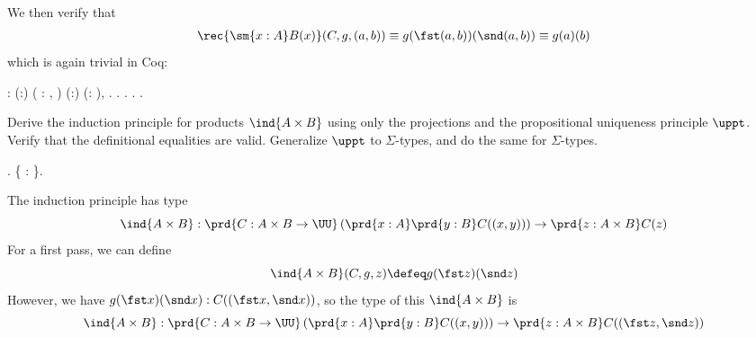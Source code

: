 \noindent
We then verify that
\begin{align*}
\rec{\sm{x:A}B(x)}(C, g, (a, b))
\equiv g(\fst (a, b))(\snd (a, b))
\equiv g(a)(b)
\end{align*}
which is again trivial in Coq: \begin{coqdoccode}
\coqdocemptyline
\coqdocindent{1.00em}
  : \coqdockw{\ensuremath{\forall}} (:) ( : \coqdockw{\ensuremath{\forall}} ,    ) (:) (: ), \coqdoceol
\coqdocindent{2.00em}
   \coqdocnotation{(}\coqdocnotation{;} \coqdocnotation{)} \coqdocnotation{=}   .\coqdoceol
\coqdocindent{1.00em}
.\coqdoceol
\coqdocindent{2.00em}
.\coqdoceol
\coqdocindent{1.00em}
.\coqdoceol
\coqdocemptyline
\coqdocnoindent
{} .\coqdoceol
\coqdocemptyline
\end{coqdoccode}
Derive the induction principle for products $\ind{A \times B}$ using only the
    projections and the propositional uniqueness principle $\uppt$.  Verify that
    the definitional equalities are valid.  Generalize $\uppt$ to $\Sigma$-types,
    and do the same for $\Sigma$-types. \begin{coqdoccode}
\coqdocemptyline
\coqdocnoindent
{} .\coqdoceol
\coqdocindent{1.00em}
 \{  : \}.\coqdoceol
\coqdocemptyline
\end{coqdoccode}
\soln 
    The induction principle has type
    \[
    \ind{A\times B} : \prd{C: A\times B \to \UU}\left(\prd{x:A}\prd{y:B}C((x,
    y))\right) \to \prd{z:A\times B}C(z)
    \]
    For a first pass, we can define
    \[
    \ind{A\times B}(C, g, z)
    \defeq
    g(\fst z)(\snd z)
    \]
    However, we have $g(\fst x)(\snd x) : C((\fst x, \snd x))$, so the type of this
    $\ind{A \times B}$ is
    \[
    \ind{A\times B} : \prd{C: A\times B \to \UU}\left(\prd{x:A}\prd{y:B}C((x,
    y))\right) \to \prd{z:A\times B}C((\fst z, \snd z))
    \]
